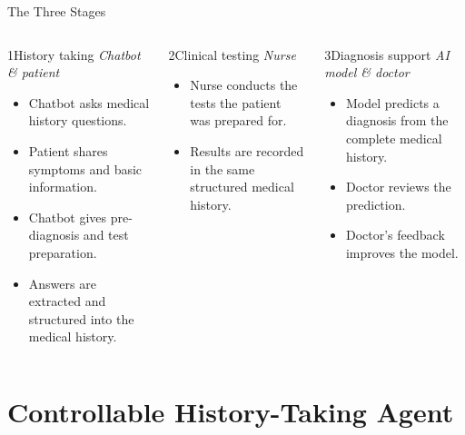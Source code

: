 \documentclass[
aspectratio=169,	%
english,			%
]{DEEclassP}
\begin{document}
\begin{frame}{The Three Stages}

\begin{columns}[t]
\begin{block}{1\quad History taking}
\footnotesize\textit{Chatbot \& patient}
\begin{itemize}
	\item Chatbot asks medical history questions.
	\item Patient shares symptoms and basic information.
	\item Chatbot gives pre-diagnosis and test preparation.
	\item Answers are extracted and structured into the medical history.
\end{itemize}
\end{block}

\begin{block}{2\quad Clinical testing}
\footnotesize\textit{Nurse}
\begin{itemize}
	\item Nurse conducts the tests the patient was prepared for.
	\item Results are recorded in the same structured medical history.
\end{itemize}
\end{block}

\begin{block}{3\quad Diagnosis support}
\footnotesize\textit{AI model \& doctor}
\begin{itemize}
	\item Model predicts a diagnosis from the complete medical history.
	\item Doctor reviews the prediction.
	\item Doctor's feedback improves the model.
\end{itemize}
\end{block}
\end{columns}

\end{frame}

\section{Controllable History-Taking Agent}
\end{document}
